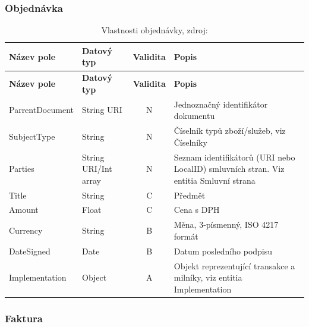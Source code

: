 \subsubsection*{Objednávka}

\begin{center}
\begin{longtable}{lp{20mm}cp{65mm}}
\label{grid_mlmmh} \\
\multicolumn{1}{l}{\textbf{Název pole}} & 
\multicolumn{1}{l}{\textbf{Datový typ}} & 
\multicolumn{1}{l}{\textbf{Validita}} & 
\multicolumn{1}{l}{\textbf{Popis}} \\ \hline 
\endfirsthead
\multicolumn{1}{l}{\textbf{Název pole}} & 
\multicolumn{1}{l}{\textbf{Datový typ}} & 
\multicolumn{1}{l}{\textbf{Validita}} & 
\multicolumn{1}{l}{\textbf{Popis}} \\ \hline 
\hline
\endhead
\endfoot
\caption[Vlastnosti objednávky]{Vlastnosti objednávky, zdroj:\cite{metodika, standard}}
\endlastfoot
ParrentDocument & String URI & N & Jednoznačný identifikátor dokumentu \\
SubjectType & String & N & Číselník typů zboží/služeb, viz Číselníky \\
Parties & String URI/Int array & N & Seznam identifikátorů (URI nebo LocalID) smluvních stran. Viz entitia Smluvní strana \\
\rowcolor{validateC}Title & String & C & Předmět \\
\rowcolor{validateC}Amount & Float & C & Cena s DPH \\
\rowcolor{validateB}Currency & String & B & Měna, 3-písmenný, ISO 4217 formát \\
\rowcolor{validateB}DateSigned & Date & B & Datum posledního podpisu \\
\rowcolor{validateA}Implementation & Object & A & Objekt reprezentující transakce a milníky, viz entitia Implementation \\
\end{longtable}
\end{center}

\subsubsection*{Faktura}

